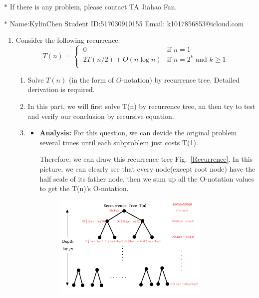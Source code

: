 \documentclass[12pt,a4paper]{article}
\makeatletter
\newtheorem*{solution}{Solution}
\theoremstyle{definition}
\renewenvironment{solution}[1][Solution] {\par\pushQED{\qed}\normalfont\topsep6\p@\@plus6\p@\relax\trivlist\item[\hskip\labelsep\bfseries#1\@addpunct{.}]\ignorespaces}{\popQED\endtrivlist\@endpefalse} \makeatother
\makeatother
\begin{document}
\noindent

\noindent{}
\begin{center}
\footnotesize{\color{red}$*$ If there is any problem, please contact TA Jiahao Fan.}

\footnotesize{\color{blue}$*$ Name:KylinChen  \quad Student ID:517030910155 \quad Email: k1017856853@icloud.com}
\end{center}

\begin{enumerate}
    \item
    Consider the following recurrence:
    \begin{equation*}
    T(n)=
    \begin{cases}
    \ 0 & \text{if } n=1 \\
    \ 2T(n/2)+O(n\log{n}) & \text{if } n=2^k \text{ and } k \geq 1 \\
    \end{cases}
    \end{equation*}
    \begin{enumerate}
        \item
        Solve $T(n)$ (in the form of $O$-notation) by recurrence tree. Detailed derivation is required.
        \begin{solution}
        \renewcommand{\qedsymbol}{}
            In this part, we will first solve T(n) by recurrence tree, an then try to test and verify our 
            conclusion by recursive equation.\item
            \begin{itemize}
            \item
            \textbf{Analysis:} For this question, we can devide the original problem several times until each subproblem just costs T(1). \par
            Therefore, we can draw this recurrence tree Fig.~\ref{Recurrence}. In this picture, we can clearly see that every node(except root node) have the half scale of its father node, then we sum up all the O-notation values to get the T(n)'s O-notation.
            \begin{figure}[htbp]
            \centering
            \includegraphics[width=0.8\textwidth]{figures/1_1.pdf}

\end{figure}
\end{itemize}
\end{solution}
\end{enumerate}
\end{enumerate}
\end{document}
